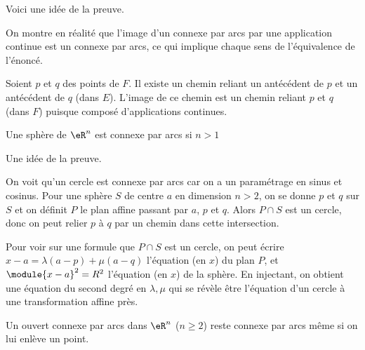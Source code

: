 \begin{normaltext}
	Voici une idée de la preuve.

	On montre en réalité que l'image d'un connexe par arcs
	par une application continue est un connexe par arcs, ce qui
	implique chaque sens de l'équivalence de l'énoncé.

	Soient \( p\) et \( q\) des points de \( F\). Il existe un chemin reliant
	un antécédent de \( p\) et un antécédent de \( q\) (dans \( E\)). L'image
	de ce chemin est un chemin reliant \( p\) et \( q\) (dans \( F\)) puisque
	composé d'applications continues.
\end{normaltext}

\begin{lemma}       \label{LEMooQFQFooDlxkw}
	Une sphère de \( \eR^n\) est connexe par arcs si \( n >1\)
\end{lemma}

\begin{normaltext}
	Une idée de la preuve.

	On voit qu'un cercle est connexe par arcs car on a un
	paramétrage en sinus et cosinus. Pour une sphère \( S\) de centre
	\( a\) en dimension \( n > 2\), on se donne \( p\) et \( q\) sur \( S\) et on
	définit \( P\) le plan affine passant par \( a\), \( p\) et \( q\). Alors \( P\cap S\) est un cercle, donc on peut relier \( p\) à \( q\) par un chemin
	dans cette intersection.

	Pour voir sur une formule que \( P \cap S\) est un cercle, on peut
	écrire \( x - a = \lambda(a-p) + \mu(a-q)\) l'équation (en \( x\)) du
	plan \( P\), et \( \module{x-a}^2 = R^2\) l'équation (en \( x\)) de la
	sphère. En injectant, on obtient une équation du second degré en
	\( \lambda,\mu\) qui se révèle être l'équation d'un cercle à une
	transformation affine près.
\end{normaltext}

\begin{lemma}       \label{LEMooDYNSooOmJbYq}
	Un ouvert connexe par arcs dans \( \eR^n\) (\( n \geq 2\)) reste connexe par arcs même si on lui enlève un point.
\end{lemma}

